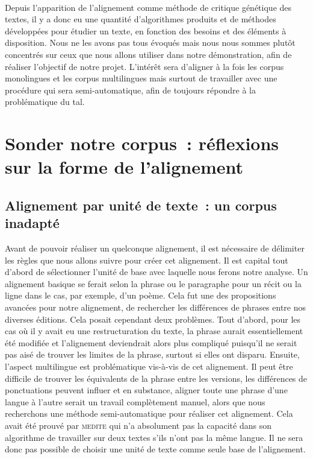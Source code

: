 \paragraph{}Depuis l'apparition de l'alignement comme méthode de critique génétique des textes, il y a donc eu une quantité d'algorithmes produits et de méthodes développées pour étudier un texte, en fonction des besoins et des éléments à disposition. Nous ne les avons pas tous évoqués mais nous nous sommes plutôt concentrés sur ceux que nous allons utiliser dans notre démonstration, afin de réaliser l'objectif de notre projet. L'intérêt sera d'aligner à la fois les corpus monolingues et les corpus multilingues mais surtout de travailler avec une procédure qui sera semi-automatique, afin de toujours répondre à la problématique du \acrshort{tal}.

\section{Sonder notre corpus~: réflexions sur la forme de l’alignement}
\subsection{Alignement par unité de texte~: un corpus inadapté}
Avant de pouvoir réaliser un quelconque alignement, il est nécessaire de délimiter les règles que nous allons suivre pour créer cet alignement. Il est capital tout d’abord de sélectionner l’unité de base avec laquelle nous ferons notre analyse. Un alignement basique se ferait selon la phrase ou le paragraphe pour un récit ou la ligne dans le cas, par exemple, d’un poème. Cela fut une des propositions avancées pour notre alignement, de rechercher les différences de phrases entre nos diverses éditions. Cela posait cependant deux problèmes. Tout d’abord, pour les cas où il y avait eu une restructuration du texte, la phrase aurait essentiellement été modifiée et l’alignement deviendrait alors plus compliqué puisqu’il ne serait pas aisé de trouver les limites de la phrase, surtout si elles ont disparu. Ensuite, l’aspect multilingue est problématique vis-à-vis de cet alignement. Il peut être difficile de trouver les équivalents de la phrase entre les versions, les différences de ponctuations peuvent influer et en substance, aligner toute une phrase d’une langue à l’autre serait un travail complètement manuel, alors que nous recherchons une méthode semi-automatique pour réaliser cet alignement. Cela avait été prouvé par \textsc{medite} qui n’a absolument pas la capacité dans son algorithme de travailler sur deux textes s’ils n’ont pas la même langue. Il ne sera donc pas possible de choisir une unité de texte comme seule base de l’alignement.

